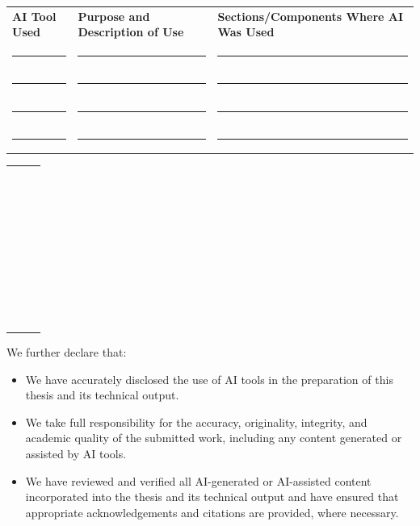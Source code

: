 \documentclass[11pt,letterpaper]{article}
\newif\iffilled
\begin{document}
\else
  \begin{tabularx}{\textwidth}{@{}p{3.8cm} X p{4.6cm}@{}}
    \textbf{AI Tool Used} & \textbf{Purpose and Description of Use} & \textbf{Sections/Components Where AI Was Used} \\[6pt]
    \rule{3.3cm}{0.4pt} & \rule{7.0cm}{0.4pt} & \rule{4.3cm}{0.4pt} \\[13pt]
    \rule{3.3cm}{0.4pt} & \rule{7.0cm}{0.4pt} & \rule{4.3cm}{0.4pt} \\[13pt]
    \rule{3.3cm}{0.4pt} & \rule{7.0cm}{0.4pt} & \rule{4.3cm}{0.4pt} \\[13pt]
    \rule{3.3cm}{0.4pt} & \rule{7.0cm}{0.4pt} & \rule{4.3cm}{0.4pt} \\
  \end{tabularx}

  \newpage %

  \vspace*{0.2cm}
  \begin{tabularx}{\textwidth}{@{}p{3.8cm} X p{4.6cm}@{}}
    \rule{3.3cm}{0.4pt} & \rule{7.0cm}{0.4pt} & \rule{4.3cm}{0.4pt} \\[13pt]
    \rule{3.3cm}{0.4pt} & \rule{7.0cm}{0.4pt} & \rule{4.3cm}{0.4pt} \\[13pt]
    \rule{3.3cm}{0.4pt} & \rule{7.0cm}{0.4pt} & \rule{4.3cm}{0.4pt} \\[13pt]
    \rule{3.3cm}{0.4pt} & \rule{7.0cm}{0.4pt} & \rule{4.3cm}{0.4pt} \\[13pt]
    \rule{3.3cm}{0.4pt} & \rule{7.0cm}{0.4pt} & \rule{4.3cm}{0.4pt} \\[13pt]
    \rule{3.3cm}{0.4pt} & \rule{7.0cm}{0.4pt} & \rule{4.3cm}{0.4pt} \\
  \end{tabularx}
\fi

\vspace{0.15cm}

\iffilled
  {\fontsize{9.5pt}{12.5pt}\selectfont We further declare that:\par}

  \vspace{0.04cm}
  \begin{itemize}[leftmargin=1.5em, itemsep=1.0pt, topsep=0pt]
    \item We have accurately disclosed the use of AI tools in the preparation of this thesis and its technical output.
    \item We take full responsibility for the accuracy, originality, integrity, and academic quality of the submitted work, including any content generated or assisted by AI tools.
    \item We have reviewed and verified all AI-generated or AI-assisted content incorporated into the thesis and its technical output and have ensured that appropriate acknowledgements and citations are provided, where necessary.
  \end{itemize}
\end{document}
